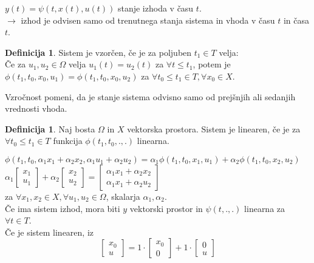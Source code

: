 \documentclass[a4paper, 12pt]{book}
\theoremstyle{definition}
\newtheorem{defn}[counter]{Definicija}
\theoremstyle{remark}
\begin{document}
$y(t) = \psi(t, x(t), u(t))$ stanje izhoda v času $t$. \\
$\to$ izhod je odvisen samo od trenutnega stanja sistema in vhoda v času $t$ in časa $t$.
\begin{defn}
  Sistem je vzorčen, če je za poljuben $t_1 \in T$ velja: \\
  Če za $u_1, u_2 \in \Omega$ velja $u_1(t) = u_2(t)$ za $\forall t \leq t_1$, potem je \\
  $\phi(t_1, t_0, x_0, u_1) = \phi(t_1, t_0, x_0, u_2)$ za $\forall t_0 \leq t_1 \in T, \forall x_0 \in X$.
\end{defn}
Vzročnost pomeni, da je stanje sistema odvisno samo od prejšnjih ali sedanjih vrednosti vhoda.
\begin{defn}
    Naj bosta $\Omega$ in $X$ vektorska prostora.
    Sistem je linearen, če je za $\forall t_0 \leq t_1 \in T$ funkcija $\phi(t_1, t_0, ., .)$ linearna.
\end{defn}
$\phi(t_1, t_0, \alpha_1 x_1 + \alpha_2 x_2, \alpha_1 u_1 + \alpha_2 u_2)
= \alpha_1 \phi(t_1, t_0, x_1, u_1) + \alpha_2 \phi(t_1, t_0, x_2, u_2)$ \\
$\alpha_1 \begin{bmatrix} x_1 \\ u_1 \end{bmatrix} + \alpha_2 \begin{bmatrix} x_2 \\ u_2 \end{bmatrix}
= \begin{bmatrix} \alpha_1 x_1 + \alpha_2 x_2 \\ \alpha_1 x_1 + \alpha_2 u_2 \end{bmatrix}$ \\
za $\forall x_1, x_2 \in X, \forall u_1, u_2 \in \Omega$, skalarja $\alpha_1, \alpha_2$. \\
Če ima sistem izhod, mora biti $y$ vektorski prostor in $\psi(t, ., .)$ linearna za $\forall t \in T$. \\
Če je sistem linearen, iz
\begin{equation*}
    \begin{bmatrix} x_0 \\ u \end{bmatrix} = 1 \cdot \begin{bmatrix} x_0 \\ 0 \end{bmatrix}
    + 1 \cdot \begin{bmatrix} 0 \\ u \end{bmatrix}
\end{equation*}
\end{document}
